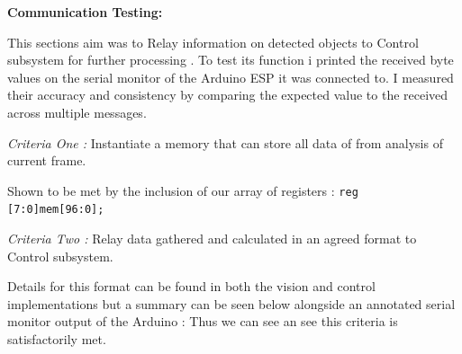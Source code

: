 \documentclass[10pt,twoside]{article}
\begin{document}
\textbf{Communication Testing: }

This sections aim was to Relay information on detected objects to Control subsystem for further processing . To test its function i printed the received byte values on the serial monitor of the Arduino ESP it was connected to. I measured their accuracy and consistency by comparing the expected value to the received across multiple messages. 

\textit{Criteria One : }Instantiate a memory that can store all data of from analysis of current frame.

Shown to  be met by the inclusion of our array of registers :  \texttt{reg [7:0]mem[96:0];}

\textit{Criteria Two : }Relay data gathered and calculated in an agreed format to Control subsystem.

Details for this format can be found in both the vision and control implementations but a summary can be seen below alongside an annotated serial monitor output of the Arduino : Thus we can see an see this criteria is satisfactorily met. 
\end{document}
